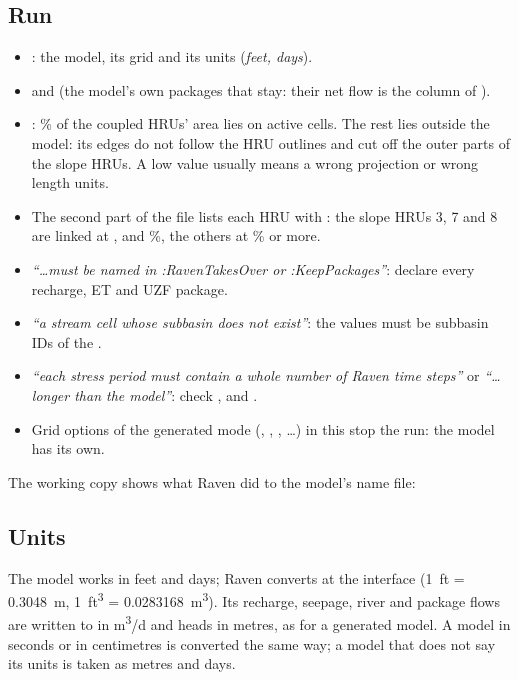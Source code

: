\subsection{Run}
\begin{tocheck}
\begin{itemize}
\item {}: the model, its grid and its units (\emph{feet, days}).
\item {} and  (the model's own packages that stay: their net flow is the
      column  of ).
\item {}: \% of the coupled HRUs' area lies on active cells. The rest lies outside the model:
      its edges do not follow the HRU outlines and cut off the outer parts of the slope HRUs. A low value usually means a
      wrong projection or wrong length units.
\item The second part of the file lists each HRU with : the slope HRUs 3, 7 and 8
      are linked at ,  and \%, the others at \% or more.
\end{itemize}
\end{tocheck}
\begin{trouble}
\begin{itemize}
\item \emph{``\dots must be named in :RavenTakesOver or :KeepPackages''}: declare every recharge, ET and UZF package.
\item \emph{``a stream cell whose subbasin does not exist''}: the  values must be subbasin IDs of the .
\item \emph{``each stress period must contain a whole number of Raven time steps''} or \emph{``\dots longer than the model''}:
      check ,  and .
\item Grid options of the generated mode (, , , \dots) in this 
      stop the run: the model has its own.
\end{itemize}
\end{trouble}
The working copy shows what Raven did to the model's name file:

\subsection{Units}
The model works in feet and days; Raven converts at the interface (1~ft = 0.3048~m, 1~ft\textsuperscript{3} =
0.0283168~m\textsuperscript{3}). Its recharge, seepage, river and package flows are written to  in
m\textsuperscript{3}/d and heads in metres, as for a generated model. A model in seconds or in centimetres is converted the
same way; a model that does not say its units is taken as metres and days.

